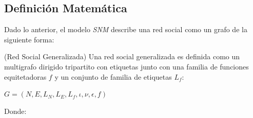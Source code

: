 \subsection{Definición Matemática} %
\label{sub:definicion_matematica}

Dado lo anterior, el modelo \emph{SNM} describe una red social como un grafo de la siguiente forma:

\begin{defn}
  (Red Social Generalizada) Una red social generalizada es definida como un multigrafo dirigido tripartito con etiquetas junto con una familia de funciones equitetadoras $f$ y un conjunto de familia de etiquetas $L_f$:
  
  \begin{center}
    $ G = (N, E, L_N, L_E, L_f, \iota, \nu, \epsilon, f) $
  \end{center}
  
  Donde:
  

\end{defn}
